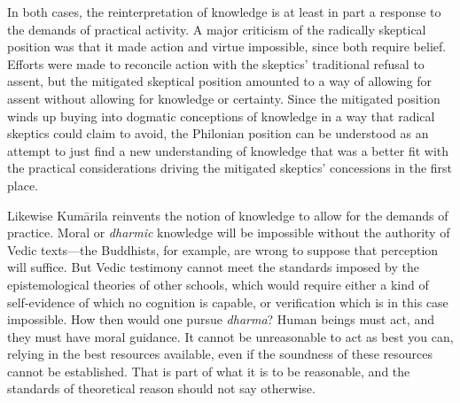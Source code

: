 ﻿\documentclass[11pt]{amsart}
\begin{document}
In both cases, the reinterpretation of knowledge is at least in part a response to the demands of practical activity. A major criticism of the radically skeptical position was that it made action and virtue impossible, since both require belief. Efforts were made to reconcile action with the skeptics' traditional refusal to assent, but the mitigated skeptical position amounted to a way of allowing for assent without allowing for knowledge or certainty. Since the mitigated position winds up buying into dogmatic conceptions of knowledge in a way that radical skeptics could claim to avoid, the Philonian position can be understood as an attempt to just find a new understanding of knowledge that was a better fit with the practical considerations driving the mitigated skeptics' concessions in the first place.

Likewise Kum\=arila reinvents the notion of knowledge to allow for the demands of practice. Moral or \emph{dharmic} knowledge will be impossible without the authority of Vedic texts---the Buddhists, for example, are wrong to suppose that perception will suffice. But Vedic testimony cannot meet the standards imposed by the epistemological theories of other schools, which would require either a kind of self-evidence of which no cognition is capable, or verification which is in this case impossible. How then would one pursue \emph{dharma}? Human beings must act, and they must have moral guidance. It cannot be unreasonable to act as best you can, relying in the best resources available, even if the soundness of these resources cannot be established. That is part of what it is to be reasonable, and the standards of theoretical reason should not say otherwise.









\end{document}
